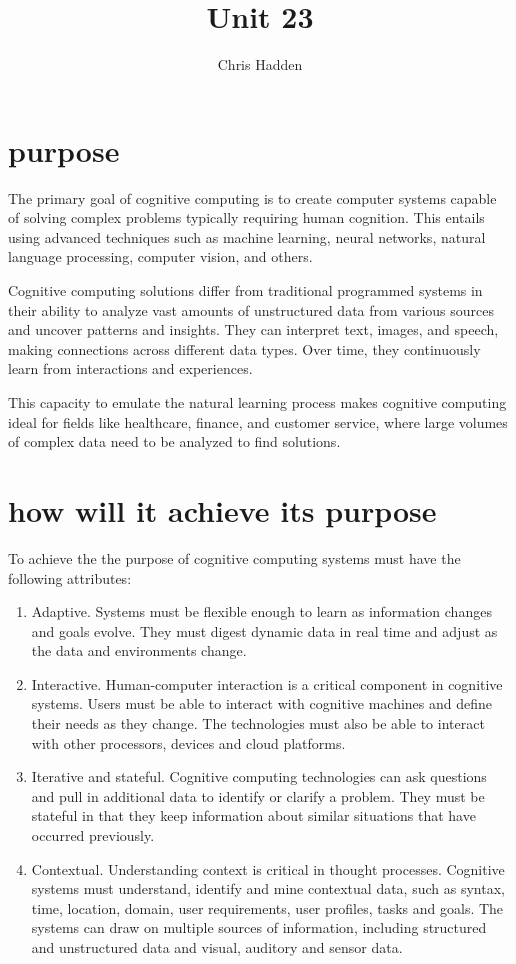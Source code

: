 \documentclass{article}
\title{Unit 23}
\author{Chris Hadden}
\date{}
\begin{document}
\maketitle


\section{purpose}
The primary goal of cognitive computing is to create computer systems capable of solving complex problems typically requiring human cognition. This entails using advanced techniques such as machine learning, neural networks, natural language processing, computer vision, and others.

Cognitive computing solutions differ from traditional programmed systems in their ability to analyze vast amounts of unstructured data from various sources and uncover patterns and insights. They can interpret text, images, and speech, making connections across different data types. Over time, they continuously learn from interactions and experiences.

This capacity to emulate the natural learning process makes cognitive computing ideal for fields like healthcare, finance, and customer service, where large volumes of complex data need to be analyzed to find solutions.

\section{how will it achieve its purpose}
To achieve the the purpose of cognitive computing systems must have the following attributes:

\begin{enumerate}
	\item Adaptive. Systems must be flexible enough to learn as information changes and goals evolve. They must digest dynamic data in real time and adjust as the data and environments change.
	\item Interactive. Human-computer interaction is a critical component in cognitive systems. Users must be able to interact with cognitive machines and define their needs as they change. The technologies must also be able to interact with other processors, devices and cloud platforms.
	\item Iterative and stateful. Cognitive computing technologies can ask questions and pull in additional data to identify or clarify a problem. They must be stateful in that they keep information about similar situations that have occurred previously.
	\item Contextual. Understanding context is critical in thought processes. Cognitive systems must understand, identify and mine contextual data, such as syntax, time, location, domain, user requirements, user profiles, tasks and goals. The systems can draw on multiple sources of information, including structured and unstructured data and visual, auditory and sensor data.
\end{enumerate}
\end{document}
